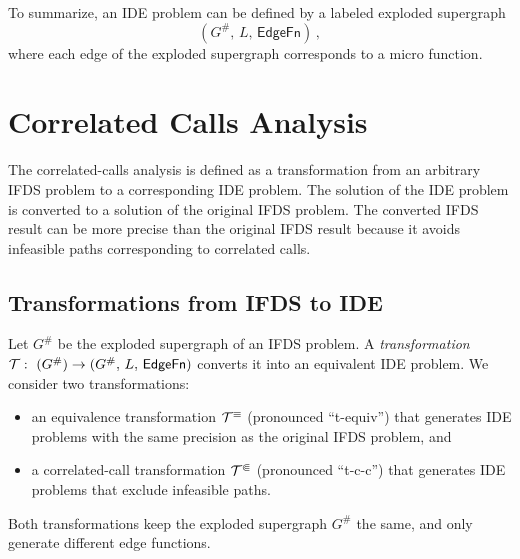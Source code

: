 To summarize, an IDE problem can be defined by a labeled exploded supergraph 
\begin{equation}(G^\#,\,L,\,\mathsf{EdgeFn})\,,\end{equation}
where each edge of the exploded supergraph corresponds to a micro function.


\section{Correlated Calls Analysis}\label{chapter:cca}
The correlated-calls analysis is defined as a transformation from an arbitrary IFDS problem to a corresponding IDE problem. The solution of the IDE problem is converted to a solution of the original IFDS problem. The converted IFDS result can be more precise than the original IFDS result because it avoids infeasible paths corresponding to correlated calls.


\subsection{Transformations from IFDS to IDE}\label{seq:transIfdsIde}


Let $G^\#$ be the exploded supergraph of an IFDS problem. A \emph{transformation}
$\mathcal T:\ (G^\#)\to (G^\#,\,L,\,\textsf{EdgeFn})$
converts it into an equivalent IDE problem. We consider two transformations:
\begin{itemize}
	\item an equivalence transformation $\mathcal T^\equiv$ (pronounced ``t-equiv'') that generates IDE problems with the same precision as the original IFDS problem, and
  \item a correlated-call transformation $\mathcal T^\Subset$ (pronounced ``t-c-c'') that generates IDE problems that exclude infeasible paths.
\end{itemize}
Both transformations keep the exploded supergraph $G^\#$ the same, and only generate different edge functions.

